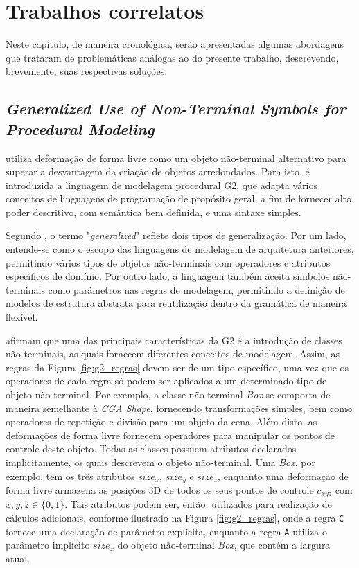\chapter{Trabalhos correlatos}
\label{cap:trabalhos-correlatos}

Neste capítulo, de maneira cronológica, serão apresentadas algumas abordagens que trataram de problemáticas análogas ao do presente trabalho, descrevendo, brevemente, suas respectivas soluções.

\section{\textit{Generalized Use of Non-Terminal Symbols for Procedural Modeling}} %
\label{sec:paper_krekclau2010}

 utiliza deformação de forma livre como um objeto não-terminal alternativo para superar a desvantagem da criação de objetos arredondados. Para isto, é introduzida a linguagem de modelagem procedural \gls{G2}, que adapta vários conceitos de linguagens de programação de propósito geral, a fim de fornecer alto poder descritivo, com semântica bem definida, e uma sintaxe simples. 

Segundo , o termo "\textit{generalized}" \; reflete dois tipos de generalização. Por um lado, entende-se como o escopo das linguagens de modelagem de arquitetura anteriores, permitindo vários tipos de objetos não-terminais com operadores e atributos específicos de domínio. Por outro lado, a linguagem também aceita símbolos não-terminais como parâmetros nas regras de modelagem, permitindo a definição de modelos de estrutura abstrata para reutilização dentro da gramática de maneira flexível. 

 afirmam que uma das principais características da \gls{G2} é a introdução de classes não-terminais, as quais fornecem diferentes conceitos de modelagem. Assim, as regras da Figura \ref{fig:g2_regras} devem ser de um tipo específico, uma vez que os operadores de cada regra só podem ser aplicados a um determinado tipo de objeto não-terminal. Por exemplo, a classe não-terminal \textit{Box} se comporta de maneira semelhante à \textit{CGA Shape}, fornecendo transformações simples, bem como operadores de repetição e divisão para um objeto da cena. Além disto, as deformações de forma livre fornecem operadores para manipular os pontos de controle deste objeto. Todas as classes possuem atributos declarados implicitamente, os quais descrevem o objeto não-terminal. Uma \textit{Box}, por exemplo, tem os três atributos $size_x$, $size_y$ e $size_z$, enquanto uma deformação de forma livre armazena as posições 3D de todos os seus pontos de controle $c_{xyz}$ com $x, y, z \in \{0, 1\}$. Tais atributos podem ser, então, utilizados para realização de cálculos adicionais, conforme ilustrado na Figura \ref{fig:g2_regras}, onde a regra \texttt{C} fornece uma declaração de parâmetro explícita, enquanto a regra \texttt{A} utiliza o parâmetro implícito $size_x$ do objeto não-terminal \textit{Box}, que contém a largura atual.

